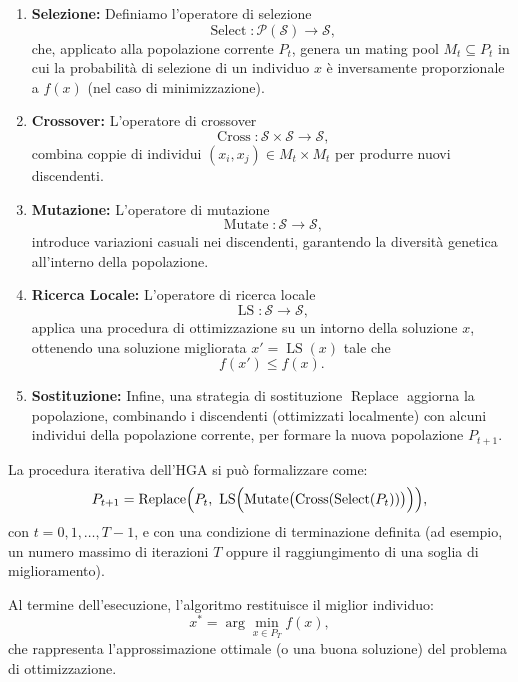 \documentclass[12pt,a4paper,twoside]{article}
\begin{document}
\begin{enumerate}
    \item \textbf{Selezione:} Definiamo l'operatore di selezione
    \[
    \operatorname{Select}: \mathcal{P}(\mathcal{S}) \to \mathcal{S},
    \]
    che, applicato alla popolazione corrente \(P_t\), genera un mating pool \(M_t \subseteq P_t\) in cui la probabilità di selezione di un individuo \(x\) è inversamente proporzionale a \(f(x)\) (nel caso di minimizzazione).

    \item \textbf{Crossover:} L'operatore di crossover
    \[
    \operatorname{Cross}: \mathcal{S} \times \mathcal{S} \to \mathcal{S},
    \]
    combina coppie di individui \((x_i, x_j) \in M_t \times M_t\) per produrre nuovi discendenti.

    \item \textbf{Mutazione:} L'operatore di mutazione
    \[
    \operatorname{Mutate}: \mathcal{S} \to \mathcal{S},
    \]
    introduce variazioni casuali nei discendenti, garantendo la diversità genetica all'interno della popolazione.

    \item \textbf{Ricerca Locale:} L'operatore di ricerca locale
    \[
    \operatorname{LS}: \mathcal{S} \to \mathcal{S},
    \]
    applica una procedura di ottimizzazione su un intorno della soluzione \(x\), ottenendo una soluzione migliorata \(x' = \operatorname{LS}(x)\) tale che
    \[
    f(x') \leq f(x).
    \]

    \item \textbf{Sostituzione:} Infine, una strategia di sostituzione \(\operatorname{Replace}\) aggiorna la popolazione, combinando i discendenti (ottimizzati localmente) con alcuni individui della popolazione corrente, per formare la nuova popolazione \(P_{t+1}\).
\end{enumerate}

La procedura iterativa dell'HGA si può formalizzare come:
\[
P_{t+1} = \operatorname{Replace}\Bigl(P_t,\ \operatorname{LS}\Bigl(\operatorname{Mutate}\bigl(\operatorname{Cross}(\operatorname{Select}(P_t))\bigr)\Bigr)\Bigr),
\]
con \(t = 0, 1, \dots, T-1\), e con una condizione di terminazione definita (ad esempio, un numero massimo di iterazioni \(T\) oppure il raggiungimento di una soglia di miglioramento).

Al termine dell'esecuzione, l'algoritmo restituisce il miglior individuo:
\[
x^* = \arg\min_{x \in P_T} f(x),
\]
che rappresenta l'approssimazione ottimale (o una buona soluzione) del problema di ottimizzazione.
\end{document}
